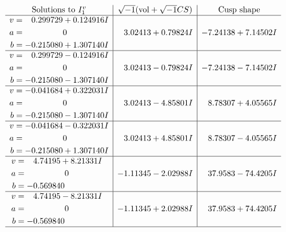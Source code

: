 \documentclass[1p]{elsarticle_modified}
\theoremstyle{definition}
\newcommand{\I}{\sqrt{-1}}
\begin{document}
$$\begin{array}{c|c|c}  
\text{Solutions to }I^v_{1}& \I (\text{vol} + \sqrt{-1}CS) & \text{Cusp shape}\\
 \hline 
\begin{aligned}
v &= \phantom{-}0.299729 + 0.124916 I \\
a &= \phantom{-0.000000 } 0 \\
b &= -0.215080 + 1.307140 I\end{aligned}
 & \phantom{-}3.02413 + 0.79824 I & -7.24138 + 7.14502 I \\ \hline\begin{aligned}
v &= \phantom{-}0.299729 - 0.124916 I \\
a &= \phantom{-0.000000 } 0 \\
b &= -0.215080 - 1.307140 I\end{aligned}
 & \phantom{-}3.02413 - 0.79824 I & -7.24138 - 7.14502 I \\ \hline\begin{aligned}
v &= -0.041684 + 0.322031 I \\
a &= \phantom{-0.000000 } 0 \\
b &= -0.215080 - 1.307140 I\end{aligned}
 & \phantom{-}3.02413 - 4.85801 I & \phantom{-}8.78307 + 4.05565 I \\ \hline\begin{aligned}
v &= -0.041684 - 0.322031 I \\
a &= \phantom{-0.000000 } 0 \\
b &= -0.215080 + 1.307140 I\end{aligned}
 & \phantom{-}3.02413 + 4.85801 I & \phantom{-}8.78307 - 4.05565 I \\ \hline\begin{aligned}
v &= \phantom{-}4.74195 + 8.21331 I \\
a &= \phantom{-0.000000 } 0 \\
b &= -0.569840\phantom{ +0.000000I}\end{aligned}
 & -1.11345 - 2.02988 I & \phantom{-}37.9583 - 74.4205 I \\ \hline\begin{aligned}
v &= \phantom{-}4.74195 - 8.21331 I \\
a &= \phantom{-0.000000 } 0 \\
b &= -0.569840\phantom{ +0.000000I}\end{aligned}
 & -1.11345 + 2.02988 I & \phantom{-}37.9583 + 74.4205 I\\
 \hline 
 \end{array}$$\newpage
\end{document}

